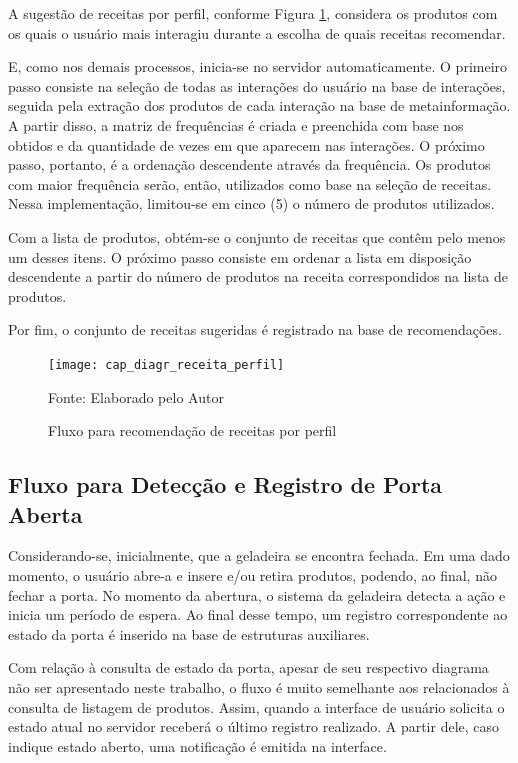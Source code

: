 A sugestão de receitas por perfil, conforme Figura \ref{fig:cap_diagr_receita_perfil}, considera os produtos com os quais o usuário mais interagiu durante a escolha de quais receitas recomendar. 

E, como nos demais processos, inicia-se no servidor automaticamente. 
O primeiro passo consiste na seleção de todas as interações do usuário na base de interações, seguida pela extração dos produtos de cada interação na base de metainformação. A partir disso, a matriz de frequências é criada e preenchida com base nos obtidos e da quantidade de vezes em que aparecem nas interações. O próximo passo, portanto, é a ordenação descendente através da frequência. Os produtos com maior frequência serão, então, utilizados como base na seleção de receitas. Nessa implementação, limitou-se em cinco (5) o número de produtos utilizados.

Com a lista de produtos, obtém-se o conjunto de receitas que contêm pelo menos um desses itens. O próximo passo consiste em ordenar a lista em disposição descendente a partir do número de produtos na receita correspondidos na lista de produtos.

Por fim, o conjunto de receitas sugeridas é registrado na base de recomendações.

\begin{figure}[H]
    \caption{Fluxo para recomendação de receitas por perfil} 
    \label{fig:cap_diagr_receita_perfil}
    \texttt{[image: cap\_diagr\_receita\_perfil]}
    
    \footnotesize{Fonte: Elaborado pelo Autor}
\end{figure}

\subsection{Fluxo para Detecção e Registro de Porta Aberta}

Considerando-se, inicialmente, que a geladeira se encontra fechada. Em uma dado momento, o usuário abre-a e insere e/ou retira produtos, podendo, ao final, não fechar a porta. No momento da abertura, o sistema da geladeira detecta a ação e inicia um período de espera. Ao final desse tempo, um registro correspondente ao estado da porta é inserido na base de estruturas auxiliares.

Com relação à consulta de estado da porta, apesar de seu respectivo diagrama não ser apresentado neste trabalho, o fluxo é muito semelhante aos relacionados à consulta de listagem de produtos. Assim, quando a interface de usuário solicita o estado atual no servidor receberá o último registro realizado. A partir dele, caso indique estado aberto, uma notificação é emitida na interface.

